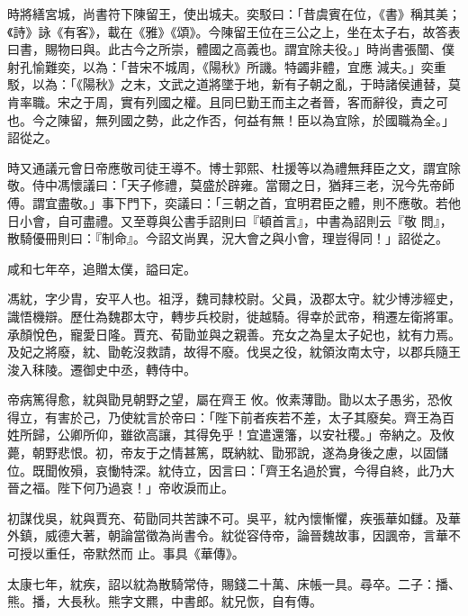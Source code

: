 \begin{pinyinscope}
 時將繕宮城，尚書符下陳留王，使出城夫。奕駁曰：「昔虞賓在位，《書》稱其美；《詩》詠《有客》，載在《雅》《頌》。今陳留王位在三公之上，坐在太子右，故答表曰書，賜物曰與。此古今之所崇，體國之高義也。謂宜除夫役。」時尚書張闓、僕射孔愉難奕，以為：「昔宋不城周，《陽秋》所譏。特蠲非體，宜應
 減夫。」奕重駁，以為：「《陽秋》之末，文武之道將墜于地，新有子朝之亂，于時諸侯逋替，莫肯率職。宋之于周，實有列國之權。且同巳勤王而主之者晉，客而辭役，責之可也。今之陳留，無列國之勢，此之作否，何益有無！臣以為宜除，於國職為全。」詔從之。



 時又通議元會日帝應敬司徒王導不。博士郭熙、杜援等以為禮無拜臣之文，謂宜除敬。侍中馮懷議曰：「天子修禮，莫盛於辟雍。當爾之日，猶拜三老，況今先帝師傅。謂宜盡敬。」事下門下，奕議曰：「三朝之首，宜明君臣之體，則不應敬。若他日小會，自可盡禮。又至尊與公書手詔則曰『頓首言』，中書為詔則云『敬
 問』，散騎優冊則曰：『制命』。今詔文尚異，況大會之與小會，理豈得同！」詔從之。



 咸和七年卒，追贈太僕，謚曰定。



 馮紞，字少胄，安平人也。祖浮，魏司隸校尉。父員，汲郡太守。紞少博涉經史，識悟機辯。歷仕為魏郡太守，轉步兵校尉，徙越騎。得幸於武帝，稍遷左衛將軍。承顏悅色，寵愛日隆。賈充、荀勖並與之親善。充女之為皇太子妃也，紞有力焉。及妃之將廢，紞、勖乾沒救請，故得不廢。伐吳之役，紞領汝南太守，以郡兵隨王浚入秣陵。遷御史中丞，轉侍中。



 帝病篤得愈，紞與勖見朝野之望，屬在齊王
 攸。攸素薄勖。勖以太子愚劣，恐攸得立，有害於己，乃使紞言於帝曰：「陛下前者疾若不差，太子其廢矣。齊王為百姓所歸，公卿所仰，雖欲高讓，其得免乎！宜遣還籓，以安社稷。」帝納之。及攸薨，朝野悲恨。初，帝友于之情甚篤，既納紞、勖邪說，遂為身後之慮，以固儲位。既聞攸殞，哀慟特深。紞侍立，因言曰：「齊王名過於實，今得自終，此乃大晉之福。陛下何乃過哀！」帝收淚而止。



 初謀伐吳，紞與賈充、荀勖同共苦諫不可。吳平，紞內懷慚懼，疾張華如讎。及華外鎮，威德大著，朝論當徵為尚書令。紞從容侍帝，論晉魏故事，因諷帝，言華不可授以重任，帝默然而
 止。事具《華傳》。



 太康七年，紞疾，詔以紞為散騎常侍，賜錢二十萬、床帳一具。尋卒。二子：播、熊。播，大長秋。熊字文羆，中書郎。紞兄恢，自有傳。



\end{pinyinscope}
